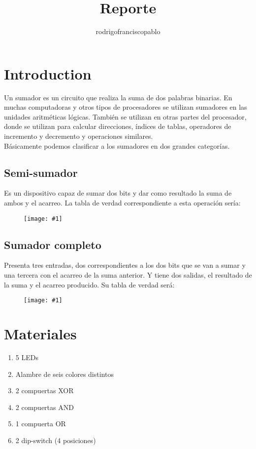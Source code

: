 \documentclass{mylib/reporte}
\title{Reporte}
\author{rodrigofranciscopablo }
\newcommand{\insertImage}[2]{
	\begin{figure}[H]
		\centering
		\texttt{[image: \#1]}
	\end{figure}
}
\begin{document}
\coverPage

\tableofcontents
\newpage

\section{Introduction}

Un sumador es un circuito que realiza la suma de dos palabras binarias.  En muchas computadoras y otros tipos de procesadores se utilizan sumadores en las unidades aritméticas lógicas. También se utilizan en otras partes del procesador, donde se utilizan para calcular direcciones, índices de tablas, operadores de incremento y decremento y operaciones similares.\\

Básicamente podemos clasificar a los sumadores en dos grandes categorías.

\subsection{Semi-sumador}
Es un dispositivo capaz de sumar dos bits y dar como resultado la suma de ambos y el acarreo. La tabla de verdad correspondiente a esta operación sería:

\insertImage{img/dise_proy2/semisum}{6}

\subsection{Sumador completo}

 Presenta tres entradas, dos correspondientes a los dos bits que se van a sumar y una tercera con el acarreo de la suma anterior. Y tiene dos salidas, el resultado de la suma y el acarreo producido. Su tabla de verdad será:

\insertImage{img/dise_proy2/fullsum}{6}

\section{Materiales}

\begin{enumerate}
	\item 5 LEDs
	\item Alambre de seis colores distintos
	\item 2 compuertas XOR
	\item 2 compuertas AND
	\item 1 compuerta OR
	\item 2 dip-switch (4 posiciones)
\end{enumerate}	
\end{document}
